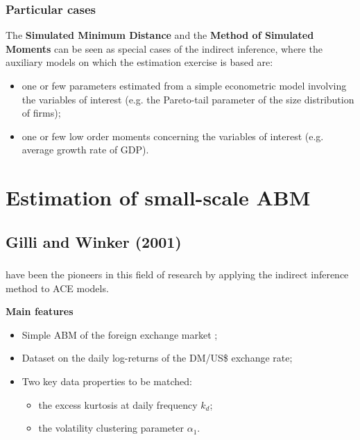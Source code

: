 \documentclass[10pt]{beamer}
\begin{document}
\begin{frame}[c]\frametitle{Particular cases}
	
	The \alert{\textbf{Simulated Minimum Distance}} \citep[SMD - ][]{hsiao1989smd} and the \alert{\textbf{Method of Simulated Moments}} \citep[MSM - ][]{mcfadden1989msm} can be seen as special cases of the indirect inference, where the auxiliary models on which the estimation exercise is based are:
	\begin{itemize}
	 	\item one or few parameters estimated from a simple econometric model involving the variables of interest (e.g. the Pareto-tail parameter of the size distribution of firms);
	 	\item one or few low order moments concerning the variables of interest (e.g. average growth rate of GDP).
	 \end{itemize}
\end{frame}


\section{Estimation of small-scale ABM}
\label{sec:smallscale_abm}


\subsection{Gilli and Winker (2001)}


\begin{frame}[c]\frametitle{\citet{gilli2001estimation}}
	\citet{gilli2001estimation} have been the pioneers in this field of research by applying the indirect inference method to ACE models. \bigskip

	\alert{\textbf{Main features}}
	\begin{itemize}
		\item Simple ABM of the foreign exchange market \citep[the][\emph{ant model}]{kirman1991epidemics};
		\item Dataset on the daily log-returns of the DM/US\$ exchange rate;
		\item Two key data properties to be matched:
		\begin{itemize}
			\item the excess kurtosis at daily frequency $k_{d}$;
			\item the volatility clustering parameter $\alpha_{1}$.
		\end{itemize}
	\end{itemize}
\end{frame}
\end{document}

